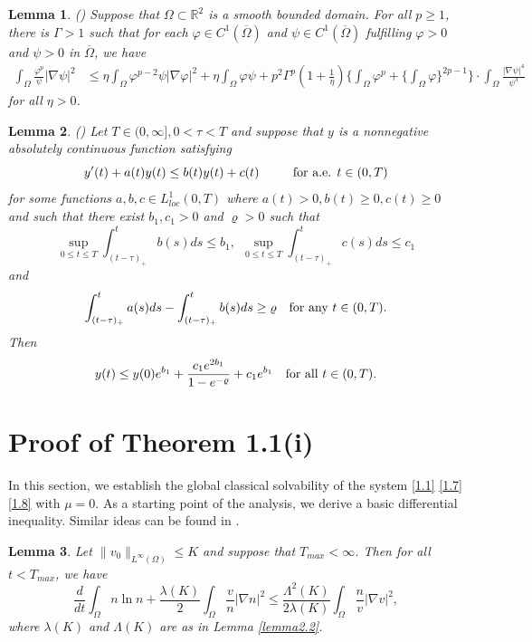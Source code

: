 \documentclass[12pt]{article}
\theoremstyle{plain}
\newtheorem{lemma}{Lemma}[section]
\theoremstyle{definition}
\numberwithin{equation}{section}
\begin{document}
\begin{lemma}\label{lemma2.4}(\cite[Lemma 3.5]{WinklerAIHP})
	Suppose that $\Omega \subset\mathbb{R}^{2}$ is a smooth bounded domain. For  all $p\geq 1$, there is $\Gamma >1$ such that
 for each  $\varphi \in C^{1}(\overline\Omega )$ and $\psi\in C^{1}(\overline\Omega)$  fulfilling $\varphi>0$ and $\psi>0$ in $\overline\Omega$, we have
\begin{equation}\label{2.9}
		\begin{split}
			\int_{\Omega} \frac{\varphi^p}{\psi} |\nabla \psi|^2 &\leq \eta \int_{\Omega}\varphi^{p-2}\psi|\nabla \varphi|^2+
\eta \int_{\Omega} \varphi \psi+p^2\Gamma^p(1+\frac 1 \eta)
 \biggl\{
 \int_{\Omega}\varphi^p+
 \biggl\{ \int_\Omega \varphi \biggr\} ^{2p-1} \biggr\} \cdot
 \int_{\Omega} \frac{|\nabla \psi|^4}{\psi^3}	
 	\end{split}
	\end{equation}
for all $\eta>0$.
\end{lemma}

\begin{lemma}\label{lemma2.5}
(\cite [Lemma 2.3] {PWang})
Let $T\in (0,\infty], 0<\tau<T$ and suppose that $y$ is a nonnegative absolutely continuous function satisfying
\begin{equation}\label{2.11}
y'(t)+a(t)y(t)\leq b(t)y(t)+c(t) \quad ~~~~~\hbox{for a.e. }t\in (0,T)
\end{equation}
for some functions $a,b,c\in L^1_{loc}(0,T)$ where $a(t)>0,b(t)\geq 0, c(t)\geq 0$ and such that there exist
$%
b_1,c_1>0$ and $\varrho>0$ such that
$$
\displaystyle\sup_{0\leq t\leq T} \int^{t}_{(t-\tau)_+} b(s)ds\leq b_1,~~
\displaystyle\sup_{0\leq t\leq T} \int^{t}_{(t-\tau)_+} c(s)ds\leq c_1
$$
 and
$$
\int^{t}_{(t-\tau)_+} a(s)ds-\int^{t}_{(t-\tau)_+} b(s)ds\geq \varrho
~~~\hbox{for any}~ t\in (0,T).$$
Then
$$
y(t)\leq y(0)e^{b_1}+\displaystyle\frac{c_1 e^{2b_1}}{1-e^{-\varrho}}+c_1e^{b_1}~~\hbox{ for all}~t\in (0,T).
$$
\end{lemma}

\section{Proof of  Theorem 1.1(i)}%

In this section, we establish the global classical solvability of the system \eqref{1.1} \eqref{1.7} \eqref{1.8}  with $\mu=0$.
As a starting point of the analysis, we derive a basic differential inequality. Similar ideas can be found in \cite{WinklerCPDE}.
\begin{lemma}\label{lemma3.1} Let  $ \|v_{0}\|_{L^{\infty}(\Omega)}\leq K$ and suppose that
$T_{max}<\infty$. Then for all $t<T_{max}$, we have
	\begin{equation}\label{3.1}
\frac d{dt}\int_\Omega n\ln n+
\frac{\lambda(K)} 2\int_\Omega\frac{v}{n}|\nabla n|^2
\leq \frac{\Lambda^2(K)}{2\lambda(K)}
 \int_\Omega\frac nv |\nabla v|^2,
\end{equation}
where $\lambda(K)$ and $\Lambda(K)$ are as in Lemma \ref{lemma2.2}.

\end{lemma}
\end{document}
